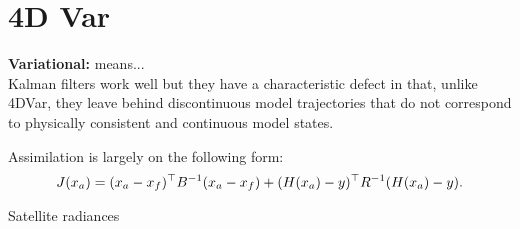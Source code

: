 \section{4D Var}

\textbf{Variational:} means...\\

Kalman filters work well but they have a characteristic defect
in that, unlike 4DVar, they leave behind discontinuous model
trajectories that do not correspond to physically consistent and
continuous model states.

Assimilation is largely on the following form:\\
\[
J(x_a) = (x_a-x_f)^\top B^{-1} (x_a - x_f) + (H(x_a)- y)^\top R^{-1} (H(x_a)-y).
\]

Satellite radiances